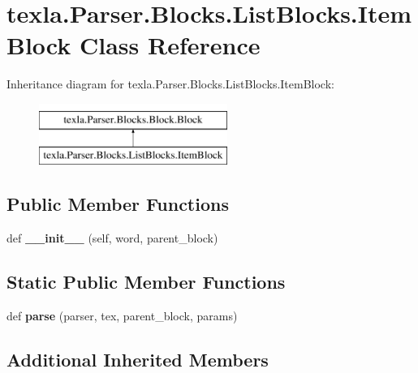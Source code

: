 \hypertarget{classtexla_1_1Parser_1_1Blocks_1_1ListBlocks_1_1ItemBlock}{}\section{texla.\+Parser.\+Blocks.\+List\+Blocks.\+Item\+Block Class Reference}
\label{classtexla_1_1Parser_1_1Blocks_1_1ListBlocks_1_1ItemBlock}
Inheritance diagram for texla.\+Parser.\+Blocks.\+List\+Blocks.\+Item\+Block\+:\begin{figure}[H]
\begin{center}
\leavevmode
\includegraphics[height=2.000000cm]{classtexla_1_1Parser_1_1Blocks_1_1ListBlocks_1_1ItemBlock}
\end{center}
\end{figure}
\subsection*{Public Member Functions}
\begin{DoxyCompactItemize}
\item 
\hypertarget{classtexla_1_1Parser_1_1Blocks_1_1ListBlocks_1_1ItemBlock_ad505df66f3879578d353543bebf257ff}{}\label{classtexla_1_1Parser_1_1Blocks_1_1ListBlocks_1_1ItemBlock_ad505df66f3879578d353543bebf257ff} 
def {\bfseries \+\_\+\+\_\+init\+\_\+\+\_\+} (self, word, parent\+\_\+block)
\end{DoxyCompactItemize}
\subsection*{Static Public Member Functions}
\begin{DoxyCompactItemize}
\item 
\hypertarget{classtexla_1_1Parser_1_1Blocks_1_1ListBlocks_1_1ItemBlock_a99fa94bc5834b7df4765bb3864b7b979}{}\label{classtexla_1_1Parser_1_1Blocks_1_1ListBlocks_1_1ItemBlock_a99fa94bc5834b7df4765bb3864b7b979} 
def {\bfseries parse} (parser, tex, parent\+\_\+block, params)
\end{DoxyCompactItemize}
\subsection*{Additional Inherited Members}


